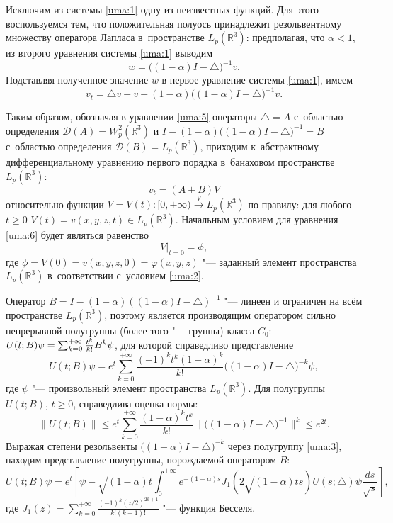Исключим из системы \eqref{uma:1} одну из неизвестных функций. 
Для этого воспользуемся тем, что положительная полуось принадлежит резольвентному множеству оператора Лапласа в~пространстве $L_p(\mathbb R^3)$: предполагая, что  $\alpha<1$, из второго уравнения системы \eqref{uma:1} выводим
\begin{equation}
w=\bigl((1-\alpha)I-\triangle\bigr)^{-1}v.
\label{uma:4}
\end{equation}
Подставляя полученное значение $w$  в первое уравнение системы \eqref{uma:1}, имеем
\begin{equation}
v_t=\triangle{v}+v-(1-\alpha)\bigl((1-\alpha)I-\triangle\bigr)^{-1}v.
\label{uma:5}
\end{equation}

Таким образом, обозначая в уравнении \eqref{uma:5} операторы $\triangle=A$ с~областью 
определения $\mathcal{D}(A)=W_p^2(\mathbb R^3)$ и $I-(1-\alpha)\bigl((1-\alpha)I-\triangle\bigr)^{-1}=B$ 
с~областью определения $\mathcal{D}(B)=L_p(\mathbb R^3)$, приходим к~абстрактному дифференциальному уравнению первого порядка в~банаховом пространстве $L_p(\mathbb R^3)$:
\begin{equation}
v _t=(A+B)V 
\label{uma:6}
\end{equation}
относительно функции $V =V (t): [0, +\infty)\stackrel{V}{\rightarrow}L_p(\mathbb R^3)$ по правилу: для любого $t\geq 0$ $V (t)=v(x,y,z,t)\in L_p(\mathbb R^3)$. 
Начальным условием для уравнения \eqref{uma:6} будет являться равенство 
\begin{equation}
V \bigl|_{t=0}=\phi,
\label{uma:7}
\end{equation}
где $\phi=V (0)=v(x, y, z, 0)=\varphi(x,y,z)$ "--- заданный элемент пространства  $L_p(\mathbb R^3)$ в~соответствии с~условием \eqref{uma:2}.

Оператор $B=I-(1-\alpha)\left((1-\alpha)I-\triangle\right)^{-1}$  "--- линеен и ограничен на всём пространстве $L_p(\mathbb R^3)$, поэтому является производящим оператором сильно непрерывной полугруппы (более того "--- группы) класса $C_0$:  $U(t; B)\psi=\sum_{k=0}^{+\infty}{t^k\over k!}B^k\psi$, 
для которой справедливо представление  
$$
U(t;B)\psi=e^t\sum_{k=0}^{+\infty}\frac{(-1)^kt^k(1-\alpha)^k}{k!}\bigl((1-\alpha)I-\triangle\bigr)^{-k}\psi,
$$ 
где $\psi$ "--- произвольный элемент пространства  $L_p(\mathbb R^3)$. Для полугруппы  $U(t;B)$,  $t\geq 0$, справедлива оценка нормы:  $$
\left\|U(t;B)\right\|\leq e^t\sum_{k=0}^{+\infty}\frac{(1-\alpha)^kt^k}{k!}\bigl\|\bigl((1-\alpha)I-\triangle\bigr)^{-1}\bigr\|^k\leq e^{2t}.
$$ 
Выражая степени резольвенты  $\bigl((1-\alpha)I-\triangle\bigr)^{-k}$ через полугруппу \eqref{uma:3}, находим представление полугруппы, порождаемой оператором  $B$:
$$
U(t;B)\psi=e^t\left[\psi-\sqrt{(1-\alpha)t}\int_0^{+\infty}e^{-(1-\alpha)s}J_1\left(2\sqrt{(1-\alpha)ts}\right)U(s;\triangle)\psi\frac{ds}{\sqrt{s}}\right],
$$ 
где
$J_1(z)=\sum_{k=0}^{+\infty}\frac{(-1)^k(z/2)^{2k+1}}{k!(k+1)!}$ "--- функция Бесселя.

